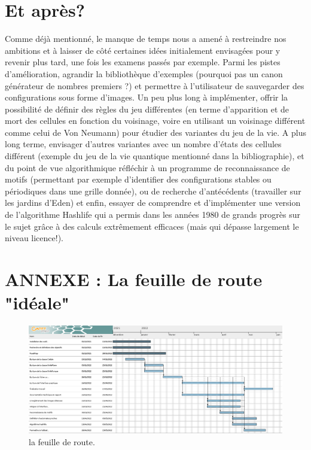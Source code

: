 \documentclass[11pt]{article}
\begin{document}
\section{Et après?}

Comme déjà mentionné, le manque de temps nous a amené à restreindre nos ambitions et à laisser de côté certaines idées initialement envisagées pour y revenir plus tard, une fois les examens passés par exemple. Parmi les pistes d'amélioration, agrandir la bibliothèque d'exemples (pourquoi pas un canon générateur de nombres premiers ?) et permettre à l'utilisateur de sauvegarder des configurations sous forme d'images. Un peu plus long à implémenter, offrir la possibilité de définir des règles du jeu différentes (en terme d'apparition et de mort des cellules en fonction du voisinage, voire en utilisant un voisinage différent comme celui de Von Neumann) pour étudier des variantes du jeu de la vie. 
A plus long terme, envisager d'autres variantes avec un nombre d'états des cellules différent (exemple du jeu de la vie quantique mentionné dans la bibliographie), et du point de vue algorithmique réfléchir à un programme de reconnaissance de motifs (permettant par exemple d'identifier des configurations stables ou périodiques dans une grille donnée), ou de recherche d'antécédents (travailler sur les jardins d'Eden) et enfin, essayer de comprendre et d'implémenter une version de l'algorithme Hashlife qui a permis dans les années 1980 de grands progrès sur le sujet grâce à des calculs extrêmement efficaces (mais qui dépasse largement le niveau licence!).

\newpage

\section*{ANNEXE\label{feuille} : La feuille de route "idéale"}

\begin{figure}[h]
    \centering%
    \begin{sideways}        
        \includegraphics[width=18cm]{./images/roadmap.png}
    \end{sideways}
    \caption{\label{fig:roadmap}la feuille de route.}
\end{figure}

\newpage 

\label{biblio}
\nocite{*}


\end{document}
